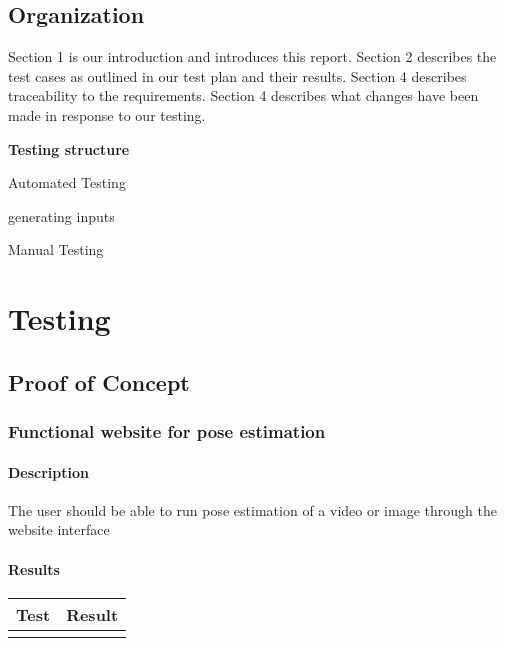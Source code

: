 \documentclass{scrreprt}
\begin{document}
\section{Organization}
    Section 1 is our introduction and introduces this report. Section 2 describes the test cases as outlined in our test plan and their results. Section 4 describes traceability to the requirements. Section 4 describes what changes have been made in response to our testing.

    \textbf{Testing structure}

    Automated Testing

    \quad generating inputs

    Manual Testing

\chapter{Testing}

\section{Proof of Concept}
\subsection{Functional website for pose estimation}
\subsubsection{Description}
The user should be able to run pose estimation of a video or image through the website interface
\subsubsection{Results}
\begin{table}[h!]
 \centering
 \begin{tabular}{||p{2.5cm}|p{2.5cm}||}
 \hline
 \bf Test & \bf Result\\
 \hline\hline
   &  \\ %
 \hline
 \end{tabular}
 \label{table:1}
\end{table}
\end{document}
